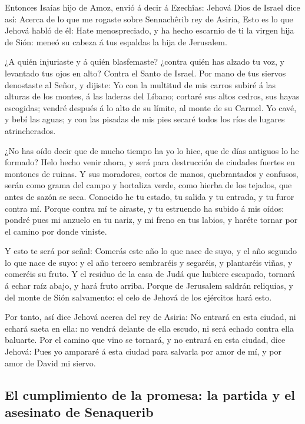  Entonces Isaías hijo de Amoz, envió á decir á Ezechîas:
Jehová Dios de Israel dice así: Acerca de lo que me rogaste sobre
Sennachêrib rey de Asiria,  Esto es lo que Jehová habló de
él: Hate menospreciado, y ha hecho escarnio de ti la virgen hija de
Sión: meneó su cabeza á tus espaldas la hija de Jerusalem.

 ¿A quién injuriaste y á quién blasfemaste? ¿contra quién
has alzado tu voz, y levantado tus ojos en alto? Contra el Santo de
Israel.  Por mano de tus siervos denostaste al Señor, y
dijiste: Yo con la multitud de mis carros subiré á las alturas de los
montes, á las laderas del Líbano; cortaré sus altos cedros, sus hayas
escogidas; vendré después á lo alto de su límite, al monte de su Carmel.
 Yo cavé, y bebí las aguas; y con las pisadas de mis pies
secaré todos los ríos de lugares atrincherados.

 ¿No has oído decir que de mucho tiempo ha yo lo hice, que
de días antiguos lo he formado? Helo hecho venir ahora, y será para
destrucción de ciudades fuertes en montones de ruinas.  Y
sus moradores, cortos de manos, quebrantados y confusos, serán como
grama del campo y hortaliza verde, como hierba de los tejados, que antes
de sazón se seca.  Conocido he tu estado, tu salida y tu
entrada, y tu furor contra mí.  Porque contra mí te
airaste, y tu estruendo ha subido á mis oídos: pondré pues mi anzuelo en
tu nariz, y mi freno en tus labios, y haréte tornar por el camino por
donde viniste.

 Y esto te será por señal: Comerás este año lo que nace de
suyo, y el año segundo lo que nace de suyo: y el año tercero sembraréis
y segaréis, y plantaréis viñas, y comeréis su fruto.  Y el
residuo de la casa de Judá que hubiere escapado, tornará á echar raíz
abajo, y hará fruto arriba.  Porque de Jerusalem saldrán
reliquias, y del monte de Sión salvamento: el celo de Jehová de los
ejércitos hará esto.

 Por tanto, así dice Jehová acerca del rey de Asiria: No
entrará en esta ciudad, ni echará saeta en ella: no vendrá delante de
ella escudo, ni será echado contra ella baluarte.  Por el
camino que vino se tornará, y no entrará en esta ciudad, dice Jehová:
 Pues yo ampararé á esta ciudad para salvarla por amor de
mí, y por amor de David mi siervo.

\hypertarget{el-cumplimiento-de-la-promesa-la-partida-y-el-asesinato-de-senaquerib}{%
\subsection{El cumplimiento de la promesa: la partida y el asesinato de
Senaquerib}\label{el-cumplimiento-de-la-promesa-la-partida-y-el-asesinato-de-senaquerib}}

